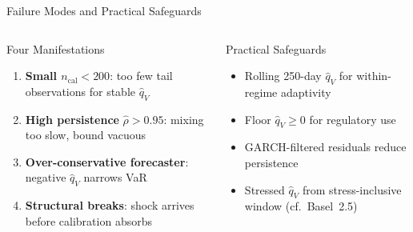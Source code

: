 \documentclass[9pt, aspectratio=169, t]{beamer}
\newcommand{\qV}{\hat{q}_V}
\begin{document}
\begin{frame}{Failure Modes and Practical Safeguards}
	\vspace{-0.2cm}
	\begin{columns}[T]
		{\small
		\begin{alertblock}{Four Manifestations}
		\begin{enumerate}\setlength{\itemsep}{2pt}
			\item \textbf{Small $n_{\mathrm{cal}} < 200$}: too few tail observations for stable $\qV$
			\item \textbf{High persistence} $\hat\rho > 0.95$: mixing too slow, bound vacuous
			\item \textbf{Over-conservative forecaster}: negative $\qV$ narrows VaR
			\item \textbf{Structural breaks}: shock arrives before calibration absorbs
		\end{enumerate}
		\end{alertblock}
		}

		{\small
		\begin{exampleblock}{Practical Safeguards}
		\begin{itemize}\setlength{\itemsep}{2pt}
			\item Rolling 250-day $\qV$ for within-regime adaptivity
			\item Floor $\qV \geq 0$ for regulatory use
			\item GARCH-filtered residuals reduce persistence
			\item Stressed $\qV$ from stress-inclusive window (cf.\ Basel~2.5)
		\end{itemize}
		\end{exampleblock}
		}
	\end{columns}
\end{frame}
\end{document}
